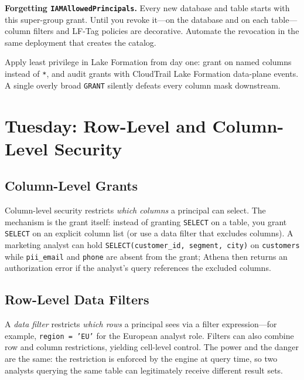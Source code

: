 \begin{pitfall}
\textbf{Forgetting \texttt{IAMAllowedPrincipals}.} Every new database and table starts with this super-group grant. Until you revoke it---on the database and on each table---column filters and LF-Tag policies are decorative. Automate the revocation in the same deployment that creates the catalog.
\end{pitfall}

\begin{notebox}
Apply least privilege in Lake Formation from day one: grant on named columns instead of \texttt{*}, and audit grants with CloudTrail Lake Formation data-plane events. A single overly broad \texttt{GRANT} silently defeats every column mask downstream.
\end{notebox}

\section{Tuesday: Row-Level and Column-Level Security}
\subsection{Column-Level Grants}
Column-level security restricts \emph{which columns} a principal can select. The mechanism is the grant itself: instead of granting \texttt{SELECT} on a table, you grant \texttt{SELECT} on an explicit column list (or use a data filter that excludes columns). A marketing analyst can hold \texttt{SELECT(customer\_id, segment, city)} on \texttt{customers} while \texttt{pii\_email} and \texttt{phone} are absent from the grant; Athena then returns an authorization error if the analyst's query references the excluded columns.

\subsection{Row-Level Data Filters}
A \emph{data filter} restricts \emph{which rows} a principal sees via a filter expression---for example, \texttt{region = 'EU'} for the European analyst role. Filters can also combine row and column restrictions, yielding cell-level control. The power and the danger are the same: the restriction is enforced by the engine at query time, so two analysts querying the same table can legitimately receive different result sets.

